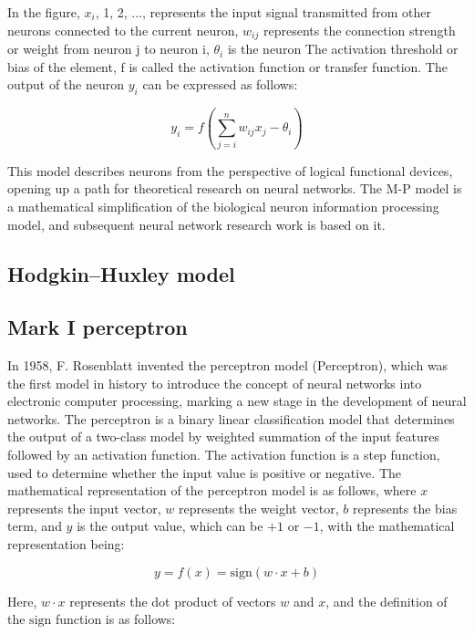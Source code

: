 \documentclass[paper=a4, fontsize=11pt]{scrartcl} %
\numberwithin{equation}{section} %
\numberwithin{figure}{section} %
\numberwithin{table}{section} %
\begin{document}
In the figure, $x_i$, 1, 2, ..., represents the input signal transmitted from other neurons connected to the current neuron, $w_{ij}$ represents the connection strength or weight from neuron j to neuron i, $\theta_i$ is the neuron The activation threshold or bias of the element, f is called the activation function or transfer function. The output of the neuron $y_i$ can be expressed as follows:

\begin{equation}
    y_i = f(\sum_{j=i}^{n} w_{ij}x_j-\theta_i)
\end{equation}


This model describes neurons from the perspective of logical functional devices, opening up a path for theoretical research on neural networks. The M-P model is a mathematical simplification of the biological neuron information processing model, and subsequent neural network research work is based on it. 

\subsection{Hodgkin–Huxley model}

\subsection{Mark I perceptron}


In 1958, F. Rosenblatt invented the perceptron model (Perceptron), which was the first model in history to introduce the concept of neural networks into electronic computer processing, marking a new stage in the development of neural networks. The perceptron is a binary linear classification model that determines the output of a two-class model by weighted summation of the input features followed by an activation function. The activation function is a step function, used to determine whether the input value is positive or negative. The mathematical representation of the perceptron model is as follows, where \( x \) represents the input vector, \( w \) represents the weight vector, \( b \) represents the bias term, and \( y \) is the output value, which can be \(+1\) or \(-1\), with the mathematical representation being:


\begin{equation}
    y = f(x) = \text{sign}(w \cdot x + b)
\end{equation}

Here, \( w \cdot x \) represents the dot product of vectors \( w \) and \( x \), and the definition of the \( \text{sign} \) function is as follows:
\end{document}
